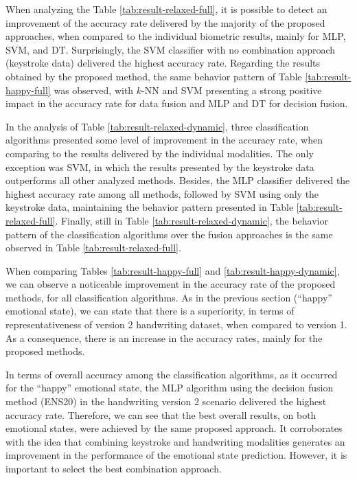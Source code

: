 \documentclass[conference]{IEEEtran}
\begin{document}
When analyzing the Table \ref{tab:result-relaxed-full}, it is possible to detect an improvement of the accuracy rate delivered by the majority of the proposed approaches, when compared to the individual biometric results, mainly for MLP, SVM, and DT. Surprisingly, the SVM classifier with no combination approach (keystroke data) delivered the highest accuracy rate. 
Regarding the results obtained by the proposed method, the same behavior pattern of Table \ref{tab:result-happy-full} was observed, with $k$-NN and SVM presenting a strong positive impact in the accuracy rate for data fusion and MLP and DT for decision fusion.

In the analysis of Table \ref{tab:result-relaxed-dynamic},  three classification algorithms presented some level of improvement in the accuracy rate, when comparing to the results delivered by the individual modalities. The only exception was SVM, in which the results presented by the keystroke data outperforms all other analyzed methods. Besides, the MLP classifier delivered the highest accuracy rate among all methods, followed by SVM using only the keystroke data, maintaining the behavior pattern presented in Table \ref{tab:result-relaxed-full}. 
Finally, still in Table \ref{tab:result-relaxed-dynamic}, the behavior pattern of the classification algorithms over the fusion approaches is the same observed in Table \ref{tab:result-relaxed-full}.

When comparing Tables \ref{tab:result-happy-full} and \ref{tab:result-happy-dynamic}, we can observe a noticeable improvement in the accuracy rate of the proposed methods, for all classification algorithms. 
As in the previous section (``happy'' emotional state), we can state that there is a  superiority, in terms of representativeness of version 2 handwriting dataset, when compared to version 1. As a consequence, there is an increase in the accuracy rates, mainly for the proposed methods.

In terms of overall accuracy among the classification algorithms, as it occurred for the ``happy'' emotional state, the MLP algorithm using the decision fusion method (ENS20) in the handwriting version 2 scenario delivered the highest accuracy rate. Therefore, we can see that the best overall results, on both emotional states, were achieved by the same proposed approach. It corroborates with the idea that combining keystroke and handwriting modalities generates an improvement in the performance of the emotional state prediction. However, it is important to select the best combination approach.
\end{document}
